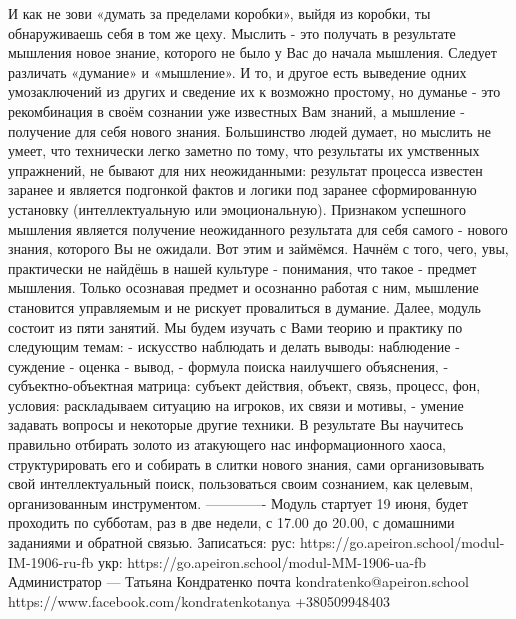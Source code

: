 И как не зови «думать за пределами коробки», выйдя из коробки, ты обнаруживаешь себя в том же цеху.
Мыслить - это получать в результате мышления новое знание, которого не было у Вас до начала мышления.
Следует различать «думание» и «мышление».
И то, и другое есть выведение одних умозаключений из других и сведение их к возможно простому, но думанье - это рекомбинация в своём сознании уже известных Вам знаний, а мышление - получение для себя нового знания. 
Большинство людей думает, но мыслить не умеет, что технически легко заметно по тому, что результаты их умственных упражнений, не бывают для них неожиданными: результат процесса известен заранее и является подгонкой фактов и логики под заранее сформированную установку (интеллектуальную или эмоциональную). 
Признаком успешного мышления является получение неожиданного результата для себя самого - нового знания, которого Вы не ожидали. 
Вот этим и займёмся.
Начнём с того, чего, увы, практически не найдёшь в нашей культуре - понимания, что такое - предмет мышления. Только осознавая предмет и осознанно работая с ним, мышление становится управляемым и не рискует провалиться в думание.
Далее, модуль состоит из пяти занятий.
Мы будем изучать с Вами теорию и практику по следующим темам:
- искусство наблюдать и делать выводы: наблюдение - суждение - оценка - вывод,
- формула поиска наилучшего объяснения, 
- субъектно-объектная матрица: субъект действия, объект, связь, процесс, фон, условия: раскладываем ситуацию на игроков, их связи и мотивы,
- умение задавать вопросы и некоторые другие техники. 
В результате Вы научитесь правильно отбирать золото из атакующего нас информационного хаоса, структурировать его и собирать в слитки нового знания, сами организовывать свой интеллектуальный поиск, пользоваться своим сознанием, как целевым, организованным инструментом. 
————-
Модуль стартует 19 июня, будет проходить по субботам, раз в две недели, с 17.00 до 20.00, с домашними заданиями и обратной связью.
Записаться:
рус:
https://go.apeiron.school/modul-IM-1906-ru-fb
укр:
https://go.apeiron.school/modul-MM-1906-ua-fb
Администратор — Татьяна Кондратенко
почта kondratenko@apeiron.school
https://www.facebook.com/kondratenkotanya
+380509948403

